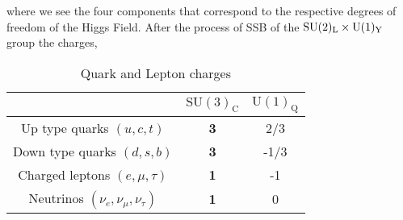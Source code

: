 %
where we see the four components that correspond to the respective degrees of freedom of the Higgs Field.
% 
After the process of SSB of the $\mathrm{SU(2)_L} \times \mathrm{U}(1)_{\mathrm{Y}}$ group the charges,
%
\begin{table}[H]
\caption{Quark and Lepton charges}
\centering
\begin{tabular}{ccc}
  \hline & $\mathrm{SU(3)_C}$ & $\mathrm{U(1)_Q}$ \\
  \hline 
Up type quarks $(u,c,t)$ & \textbf{3} & 2/3 \\
Down type quarks $(d,s,b)$ & \textbf{3} & -1/3 \\
Charged leptons $(e,\mu,\tau)$ & \textbf{1} & -1 \\
Neutrinos  $(\nu_e,\nu_\mu,\nu_\tau)$  & \textbf{1} & 0 \\
  \hline	
\end{tabular}
\end{table}

